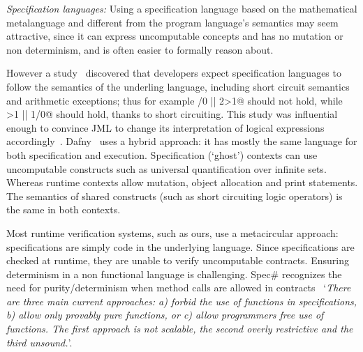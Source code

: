 


\textit{Specification languages:}
Using a specification language based on the mathematical metalanguage and different from the program language's semantics may seem attractive, since it can express uncomputable concepts and has no mutation or non determinism, and is often easier to formally reason about.

However a study~\cite{chalin2007logical} discovered that developers expect specification languages to follow the semantics of the underling language, including short circuit semantics and arithmetic exceptions; thus for example /0 || 2>1@ should not hold, while >1 || 1/0@ should hold, thanks to short circuiting.
This study was influential enough to convince JML to change its interpretation of logical expressions
accordingly~\cite{chalin2008jml}.
Dafny~\cite{DBLP:conf/sigada/Leino12} uses a hybrid approach: it has mostly the same language for both specification and execution. Specification (`ghost') contexts can use uncomputable constructs such as universal quantification over infinite sets. Whereas runtime contexts allow mutation, object allocation and print statements. The semantics of shared constructs (such as short circuiting logic operators) is the same in both contexts.

Most runtime verification systems, such as ours, use a metacircular approach: specifications are simply code in the underlying language. Since specifications are checked at runtime, they are unable to verify uncomputable contracts.
 Ensuring determinism in a non functional language is challenging. Spec\# recognizes the need for purity/determinism when method calls are allowed in contracts~\cite{barnett200499} `\emph{There are three main current approaches: a) forbid the use of functions in specifications, b) allow only provably pure functions, or c) allow programmers free use
	of functions. The first approach is not scalable, the second overly restrictive and
	the third unsound.}'.

